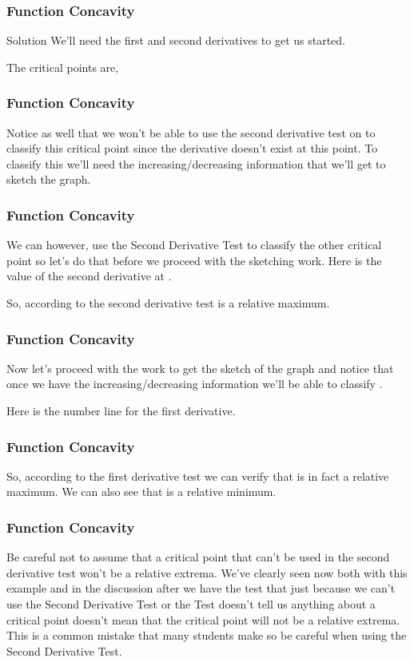 \documentclass{beamer}
\begin{document}
\begin{frame} 
	\frametitle{Function Concavity}  
 
 Solution
 We’ll need the first and second derivatives to get us started.
 
 The critical points are,
\end{frame}
\begin{frame} 
	\frametitle{Function Concavity}  
 Notice as well that we won’t be able to use the second derivative test on  to classify this critical point since the derivative doesn’t exist at this point.  To classify this we’ll need the increasing/decreasing information that we’ll get to sketch the graph.
\end{frame}
\begin{frame} 
	\frametitle{Function Concavity}  
 We can however, use the Second Derivative Test to classify the other critical point so let’s do that before we proceed with the sketching work.  Here is the value of the second derivative at .
 
 
 So, according to the second derivative test  is a relative maximum.
\end{frame}
\begin{frame} 
	\frametitle{Function Concavity}  
 Now let’s proceed with the work to get the sketch of the graph and notice that once we have the increasing/decreasing information we’ll be able to classify .
 
 Here is the number line for the first derivative.
\end{frame}
\begin{frame} 
	\frametitle{Function Concavity}  
 So, according to the first derivative test we can verify that  is in fact a relative maximum.  We can also see that  is a relative minimum. 
\end{frame}
\begin{frame} 
	\frametitle{Function Concavity} 
 Be careful not to assume that a critical point that can’t be used in the second derivative test won’t be a relative extrema.  We’ve clearly seen now both with this example and in the discussion after we have the test that just because we can’t use the Second Derivative Test or the Test doesn’t tell us anything about a critical point doesn’t mean that the critical point will not be a relative extrema.  This is a common mistake that many students make so be careful when using the Second Derivative Test.
\end{frame}
\end{document}
